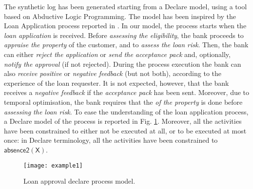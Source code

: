 The synthetic log has been generated starting from a Declare model, using a tool \cite{2020-Loreti} based on Abductive Logic Programming. The model has been inspired by the Loan Application process reported in \cite{DBLP:books/sp/DumasRMR18}. In our model, the process starts when the \emph{loan application} is received. Before \emph{assessing the eligibility}, the bank proceeds to \emph{appraise the property} of the customer, and to \emph{assess the loan risk}. Then, the bank can either \emph{reject the application} or \emph{send the acceptance pack} and, optionally, \emph{notify the approval} (if not rejected). During the process execution the bank can also \emph{receive positive} or \emph{negative feedback} (but not both), according to the experience of the loan requester. It is not expected, however, that the bank receives a \emph{negative feedback} if the \emph{acceptance pack} has been sent. Moreover, due to temporal optimisation, the bank requires that the \emph{of the property} is done before \emph{assessing the loan risk}.
To ease the understanding of the loan application process, a Declare model of the process is reported in Fig. \ref{fig:ex}. Moreover, all the activities have been constrained to either not be executed at all, or to be executed at most once: in Declare terminology, all the activities have been constrained to $\mathsf{absence2(X)}$.

\begin{figure}[t]
\centering
\texttt{[image: example1]}
\caption{Loan approval declare process model.}
\label{fig:ex}
\end{figure}

